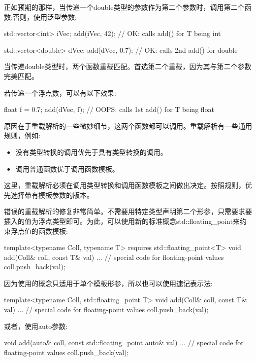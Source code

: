 正如预期的那样，当传递一个double类型的参数作为第二个参数时，调用第二个函数;否则，使用泛型参数:

\begin{cpp}
std::vector<int> iVec;
add(iVec, 42); // OK: calls add() for T being int

std::vector<double> dVec;
add(dVec, 0.7); // OK: calls 2nd add() for double
\end{cpp}

当传递double类型时，两个函数重载匹配。首选第二个重载，因为其与第二个参数完美匹配。

若传递一个浮点数，可以有以下效果:

\begin{cpp}
float f = 0.7;
add(dVec, f); // OOPS: calls 1st add() for T being float
\end{cpp}

原因在于重载解析的一些微妙细节，这两个函数都可以调用。重载解析有一些通用规则，例如:

\begin{itemize}
\item
没有类型转换的调用优先于具有类型转换的调用。

\item
调用普通函数优于调用函数模板。
\end{itemize}

这里，重载解析必须在调用类型转换和调用函数模板之间做出决定。按照规则，优先选择带有模板参数的版本。


错误的重载解析的修复非常简单。不需要用特定类型声明第二个形参，只需要求要插入的值为浮点类型即可。为此，可以使用新的标准概念std::floating\_point来约束浮点值的函数模板:

\begin{cpp}
template<typename Coll, typename T>
requires std::floating_point<T>
void add(Coll& coll, const T& val)
{
	... // special code for floating-point values
	coll.push_back(val);
}
\end{cpp}

因为使用的概念只适用于单个模板形参，所以也可以使用速记表示法:

\begin{cpp}
template<typename Coll, std::floating_point T>
void add(Coll& coll, const T& val)
{
	... // special code for floating-point values
	coll.push_back(val);
}
\end{cpp}

或者，使用auto参数:

\begin{cpp}
void add(auto& coll, const std::floating_point auto& val)
{
	... // special code for floating-point values
	coll.push_back(val);
}
\end{cpp}

